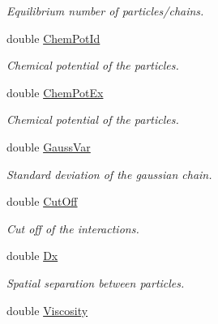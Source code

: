 \begin{DoxyCompactItemize}
\begin{DoxyCompactList}\small\item\em Equilibrium number of particles/chains. \end{DoxyCompactList}\item 
double \hyperlink{classForces_a2e25f2942dd28ddaf03d12e8ece82c9a}{Chem\+Pot\+Id}\hypertarget{classForces_a2e25f2942dd28ddaf03d12e8ece82c9a}{}\label{classForces_a2e25f2942dd28ddaf03d12e8ece82c9a}

\begin{DoxyCompactList}\small\item\em Chemical potential of the particles. \end{DoxyCompactList}\item 
double \hyperlink{classForces_ab7f8fa6b5791ce382b080bb3cb2ff87a}{Chem\+Pot\+Ex}\hypertarget{classForces_ab7f8fa6b5791ce382b080bb3cb2ff87a}{}\label{classForces_ab7f8fa6b5791ce382b080bb3cb2ff87a}

\begin{DoxyCompactList}\small\item\em Chemical potential of the particles. \end{DoxyCompactList}\item 
double \hyperlink{classForces_a0b6541f9bb6a818203ef208f3f5ee9ea}{Gauss\+Var}\hypertarget{classForces_a0b6541f9bb6a818203ef208f3f5ee9ea}{}\label{classForces_a0b6541f9bb6a818203ef208f3f5ee9ea}

\begin{DoxyCompactList}\small\item\em Standard deviation of the gaussian chain. \end{DoxyCompactList}\item 
double \hyperlink{classForces_af2411aba2dd63fa22b1bc279653ff7a0}{Cut\+Off}\hypertarget{classForces_af2411aba2dd63fa22b1bc279653ff7a0}{}\label{classForces_af2411aba2dd63fa22b1bc279653ff7a0}

\begin{DoxyCompactList}\small\item\em Cut off of the interactions. \end{DoxyCompactList}\item 
double \hyperlink{classForces_aea50b2cb321ee5dfaa107a0726838e1a}{Dx}\hypertarget{classForces_aea50b2cb321ee5dfaa107a0726838e1a}{}\label{classForces_aea50b2cb321ee5dfaa107a0726838e1a}

\begin{DoxyCompactList}\small\item\em Spatial separation between particles. \end{DoxyCompactList}\item 
double \hyperlink{classForces_a0846f0b0f68bb4cbe7b44d53f6200139}{Viscosity}\hypertarget{classForces_a0846f0b0f68bb4cbe7b44d53f6200139}{}\label{classForces_a0846f0b0f68bb4cbe7b44d53f6200139}


\end{DoxyCompactItemize}
